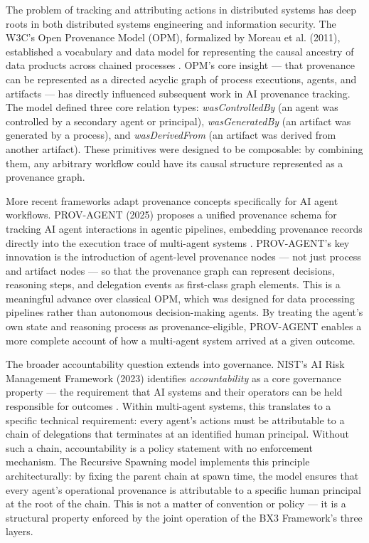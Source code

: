 {{The problem of tracking and attributing actions in distributed systems has deep roots in both distributed systems engineering and information security. The W3C's Open Provenance Model (OPM), formalized by Moreau et al. (2011), established a vocabulary and data model for representing the causal ancestry of data products across chained processes \cite{moreau2015-prov}. OPM's core insight — that provenance can be represented as a directed acyclic graph of process executions, agents, and artifacts — has directly influenced subsequent work in AI provenance tracking. The model defined three core relation types: \textit{wasControlledBy} (an agent was controlled by a secondary agent or principal), \textit{wasGeneratedBy} (an artifact was generated by a process), and \textit{wasDerivedFrom} (an artifact was derived from another artifact). These primitives were designed to be composable: by combining them, any arbitrary workflow could have its causal structure represented as a provenance graph.

More recent frameworks adapt provenance concepts specifically for AI agent workflows. PROV-AGENT (2025) proposes a unified provenance schema for tracking AI agent interactions in agentic pipelines, embedding provenance records directly into the execution trace of multi-agent systems \cite{prov-agent2025}. PROV-AGENT's key innovation is the introduction of agent-level provenance nodes — not just process and artifact nodes — so that the provenance graph can represent decisions, reasoning steps, and delegation events as first-class graph elements. This is a meaningful advance over classical OPM, which was designed for data processing pipelines rather than autonomous decision-making agents. By treating the agent's own state and reasoning process as provenance-eligible, PROV-AGENT enables a more complete account of how a multi-agent system arrived at a given outcome.

The broader accountability question extends into governance. NIST's AI Risk Management Framework (2023) identifies \textit{accountability} as a core governance property — the requirement that AI systems and their operators can be held responsible for outcomes \cite{nist2023}. Within multi-agent systems, this translates to a specific technical requirement: every agent's actions must be attributable to a chain of delegations that terminates at an identified human principal. Without such a chain, accountability is a policy statement with no enforcement mechanism. The Recursive Spawning model implements this principle architecturally: by fixing the parent chain at spawn time, the model ensures that every agent's operational provenance is attributable to a specific human principal at the root of the chain. This is not a matter of convention or policy — it is a structural property enforced by the joint operation of the BX3 Framework's three layers.

}}

